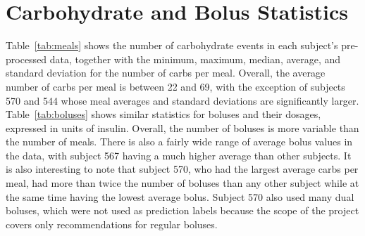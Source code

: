 \section{Carbohydrate and Bolus Statistics}
\label{sec:statistics}

Table~\ref{tab:meals} shows the number of carbohydrate events in each subject's pre-processed data, together with the minimum, maximum, median, average, and standard deviation for the number of carbs per meal. Overall, the average number of carbs per meal is between 22 and 69, with the exception of subjects 570 and 544 whose meal averages and standard deviations are significantly larger. 
Table~\ref{tab:boluses} shows similar statistics for boluses and their dosages, expressed in units of insulin.
Overall, the number of boluses is more variable than the number of meals. There is also a fairly wide range of average bolus values in the data, with subject 567 having a much higher average than other subjects. It is also interesting to note that subject 570, who had the largest average carbs per meal, had more than twice the number of boluses than any other subject while at the same time having the lowest average bolus. Subject 570 also used many dual boluses, which were not used as prediction labels because the scope of the project covers only recommendations for regular boluses.

